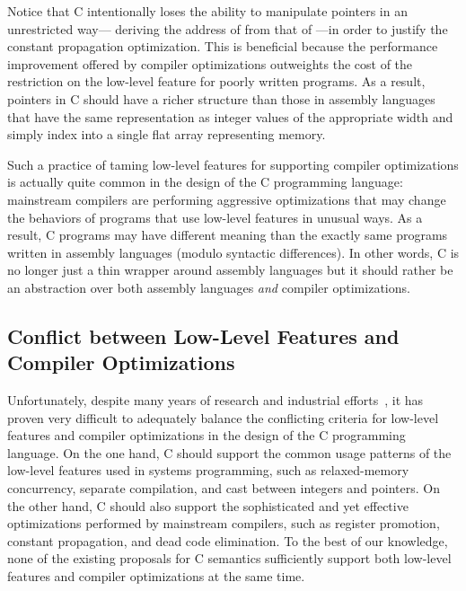 Notice that C intentionally loses the ability to manipulate pointers in an unrestricted way---\eg{}
deriving the address of  from that of ---in order to justify the constant
propagation optimization.  This is beneficial because the performance improvement offered by
compiler optimizations outweights the cost of the restriction on the low-level feature for poorly
written programs.  As a result, pointers in C should have a richer structure than those in assembly
languages that have the same representation as integer values of the appropriate width and simply
index into a single flat array representing memory.

Such a practice of taming low-level features for supporting compiler optimizations is actually quite
common in the design of the C programming language: mainstream compilers are performing aggressive
optimizations that may change the behaviors of programs that use low-level features in unusual ways.
As a result, C programs may have different meaning than the exactly same programs written in
assembly languages (modulo syntactic differences).  In other words, C is no longer just a thin
wrapper around assembly languages but it should rather be an abstraction over both assembly
languages \emph{and} compiler optimizations.



\subsection{Conflict between Low-Level Features and Compiler Optimizations}
\label{sec:introduction:problem}

Unfortunately, despite many years of research and industrial efforts~\cite{c18}, it has proven very
difficult to adequately balance the conflicting criteria for low-level features and compiler
optimizations in the design of the C programming language.  On the one hand, C should support the
common usage patterns of the low-level features used in systems programming, such as relaxed-memory
concurrency, separate compilation, and cast between integers and pointers.  On the other hand, C
should also support the sophisticated and yet effective optimizations performed by mainstream
compilers, such as register promotion, constant propagation, and dead code elimination.  To the best
of our knowledge, none of the existing proposals for C semantics sufficiently support both low-level
features and compiler optimizations at the same time.

